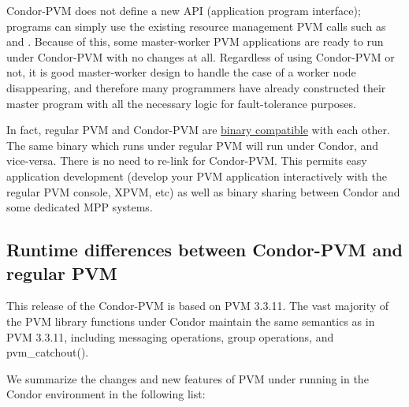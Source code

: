 Condor-PVM does not define a new API (application program interface);
programs can simply use the existing resource management PVM calls such
as  and .  Because of this, some
master-worker PVM applications are ready to run under Condor-PVM with no
changes at all.  Regardless of using Condor-PVM or not, it is good
master-worker design to handle the case of a worker node disappearing,
and therefore many programmers have already constructed their master program
with all the necessary logic for fault-tolerance purposes.  

In fact, regular PVM and Condor-PVM are \underline{binary compatible}
with each other.  The same binary which runs under regular PVM will run
under Condor, and vice-versa.  There is no need to re-link for Condor-PVM.
This permits easy application development
(develop your PVM application interactively with the regular PVM console, XPVM,
etc) as well as binary sharing between Condor and some dedicated MPP systems.

\subsection{Runtime differences between Condor-PVM and regular PVM}

This release of the Condor-PVM is based on PVM 3.3.11.  The vast majority of the PVM
library functions under Condor maintain the same semantics as in
PVM 3.3.11, including messaging operations, group operations, and 
pvm\_catchout().

We summarize the changes and new features of PVM under running in the
Condor environment in the following list:

